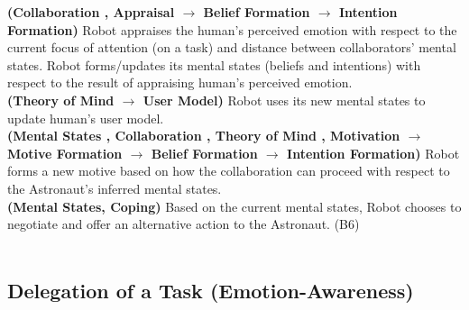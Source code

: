 \noindent\textbf{(Collaboration , Appraisal $\rightarrow$ Belief Formation
$\rightarrow$ Intention Formation)} Robot appraises the human's perceived
emotion with respect to the current focus of attention (on a task) and distance
between collaborators' mental states. Robot forms/updates its mental states
(beliefs and intentions) with respect to the result of appraising human's
perceived emotion.\\

\noindent\textbf{(Theory of Mind $\rightarrow$ User Model)} Robot uses its new
mental states to update human's user model.\\

\noindent\textbf{(Mental States , Collaboration , Theory of Mind , Motivation
$\rightarrow$ Motive Formation $\rightarrow$ Belief Formation $\rightarrow$
Intention Formation)} Robot forms a new motive based on how the collaboration
can proceed with respect to the Astronaut's inferred mental states.\\

\noindent\textbf{(Mental States, Coping)} Based on the current mental states,
Robot chooses to negotiate and offer an alternative action to the Astronaut.
(B6)\\

\noindent{}\\
  
\noindent{}

\subsection{Delegation of a Task (Emotion-Awareness)}
\label{sec:wt-exp3}

\noindent{}\\

